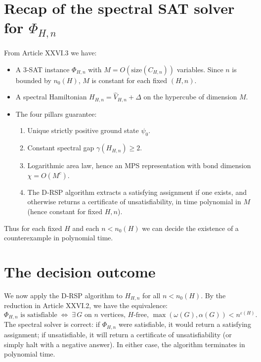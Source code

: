 \documentclass[11pt,a4paper]{article}
\begin{document}
\section{Recap of the spectral SAT solver for $\Phi_{H,n}$}
From Article XXVI.3 we have:
\begin{itemize}
\item A 3‑SAT instance $\Phi_{H,n}$ with $M = O(\text{size}(C_{H,n}))$ variables. Since $n$ is bounded by $n_0(H)$, $M$ is constant for each fixed $(H,n)$.
\item A spectral Hamiltonian $H_{H,n} = \hat{V}_{H,n} + \Delta$ on the hypercube of dimension $M$.
\item The four pillars guarantee:
  \begin{enumerate}
  \item Unique strictly positive ground state $\psi_0$.
  \item Constant spectral gap $\gamma(H_{H,n}) \ge 2$.
  \item Logarithmic area law, hence an MPS representation with bond dimension $\chi = O(M^c)$.
  \item The D‑RSP algorithm extracts a satisfying assignment if one exists, and otherwise returns a certificate of unsatisfiability, in time polynomial in $M$ (hence constant for fixed $H,n$).
  \end{enumerate}
\end{itemize}
Thus for each fixed $H$ and each $n < n_0(H)$ we can decide the existence of a counterexample in polynomial time.

\section{The decision outcome}
We now apply the D‑RSP algorithm to $H_{H,n}$ for all $n < n_0(H)$. By the reduction in Article XXVI.2, we have the equivalence:
\[
\Phi_{H,n} \text{ is satisfiable} \;\Longleftrightarrow\; \exists\, G \text{ on } n \text{ vertices, } H\text{-free, } \max(\omega(G),\alpha(G)) < n^{\varepsilon(H)}.
\]
The spectral solver is correct: if $\Phi_{H,n}$ were satisfiable, it would return a satisfying assignment; if unsatisfiable, it will return a certificate of unsatisfiability (or simply halt with a negative answer). In either case, the algorithm terminates in polynomial time.
\end{document}
